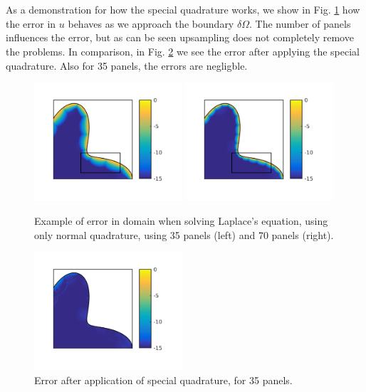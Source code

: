 \documentclass[a4paper,10pt]{article}
\begin{document}
\\ \\
As a demonstration for how the special quadrature works, we show in Fig. \ref{fig:normquad} how the error in $u$ behaves as we approach the boundary $\delta\Omega$. The number of panels influences the error, but as can be seen upsampling does not completely remove the problems. In comparison, in Fig. \ref{fig:specquad} we see the error after applying the special quadrature. Also for 35 panels, the errors are negligble. 
\begin{figure}[ht]
    \begin{center}
        \includegraphics[width=0.49\textwidth]{Graphics/filled_error_panels35.png}
        \includegraphics[width =0.49\textwidth]{Graphics/filled_error_panels70.png}
    \end{center}
    \caption{Example of error in domain when solving Laplace's equation, using only normal quadrature, using 35 panels (left) and 70 panels (right).}
    \label{fig:normquad}
\end{figure}
\begin{figure}[ht]
    \begin{center}
        \includegraphics[width=0.49\textwidth]{Graphics/fillederror_SQ_panels35.png}
        \end{center}
    \caption{Error after application of special quadrature, for 35 panels.}
    \label{fig:specquad}
\end{figure}
\end{document}
